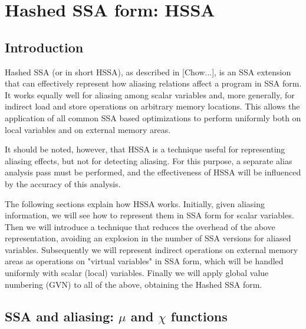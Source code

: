 \chapter{Hashed SSA form: HSSA }


\section{Introduction}

Hashed SSA (or in short HSSA), as described in [Chow...], is an SSA extension that can effectively represent how aliasing relations affect a program in SSA form. It works equally well for aliasing among scalar variables and, more generally, for indirect load and store operations on arbitrary memory locations. This allows the application of all common SSA based optimizations to perform uniformly both on local variables and on external memory areas.

It should be noted, however, that HSSA is a technique useful for representing aliasing effects, but not for detecting aliasing. For this purpose, a separate alias analysis pass must be performed, and the effectiveness of HSSA will be influenced by the accuracy of this analysis.

The following sections explain how HSSA works. Initially, given aliasing information, we will see how to represent them in SSA form for scalar variables. Then we will introduce a technique that reduces the overhead of the above representation, avoiding an explosion in the number of SSA versions for aliased variables. Subsequently we will represent indirect operations on external memory areas as operations on "virtual variables" in SSA form, which will be handled uniformly with scalar (local) variables.
Finally we will apply global value numbering (GVN) to all of the above, obtaining the Hashed SSA form.


\section{SSA and aliasing: $\mu$ and $\chi$ functions}


